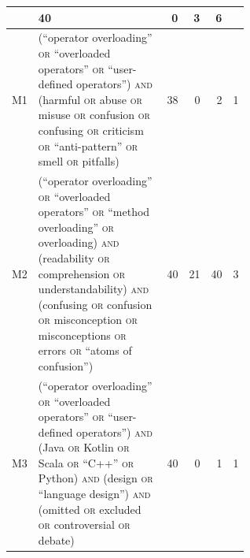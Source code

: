 \begin{table}[!b]
\begin{tabular}{@{}lp{0.6\linewidth}rrrr@{}}
         & 40 & 0 & 3 & 6 \\
      \midrule
      M1 & (\enquote{operator overloading} \textsc{or} \enquote{overloaded operators} \textsc{or} \enquote{user-defined operators}) \textsc{and} (harmful \textsc{or} abuse \textsc{or} misuse \textsc{or} confusion \textsc{or} confusing \textsc{or} criticism \textsc{or} \enquote{anti-pattern} \textsc{or} smell \textsc{or} pitfalls)
         & 38 & 0 & 2 & 1 \\
      M2 & (\enquote{operator overloading} \textsc{or} \enquote{overloaded operators} \textsc{or} \enquote{method overloading} \textsc{or} overloading) \textsc{and} (readability \textsc{or} comprehension \textsc{or} understandability) \textsc{and} (confusing \textsc{or} confusion \textsc{or} misconception \textsc{or} misconceptions \textsc{or} errors \textsc{or} \enquote{atoms of confusion})
         & 40 & 21 & 40 & 3 \\
      M3 & (\enquote{operator overloading} \textsc{or} \enquote{overloaded operators} \textsc{or} \enquote{user-defined operators}) \textsc{and} (Java \textsc{or} Kotlin \textsc{or} Scala \textsc{or} \enquote{C++} \textsc{or} Python) \textsc{and} (design \textsc{or} \enquote{language design}) \textsc{and} (omitted \textsc{or} excluded \textsc{or} controversial \textsc{or} debate)
         & 40 & 0 & 1 & 1 \\
      \bottomrule
    \end{tabular}
\end{table}

